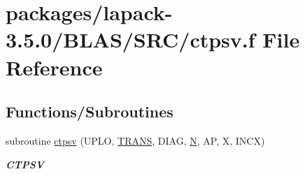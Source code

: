 \hypertarget{lapack-3_85_80_2BLAS_2SRC_2ctpsv_8f}{}\section{packages/lapack-\/3.5.0/\+B\+L\+A\+S/\+S\+R\+C/ctpsv.f File Reference}
\label{lapack-3_85_80_2BLAS_2SRC_2ctpsv_8f}
\subsection*{Functions/\+Subroutines}
\begin{DoxyCompactItemize}
\item 
subroutine \hyperlink{group__complex__blas__level2_ga1afdec04246cf2d0cb650ec237296ef3}{ctpsv} (U\+P\+L\+O, \hyperlink{superlu__enum__consts_8h_a0c4e17b2d5cea33f9991ccc6a6678d62a1f61e3015bfe0f0c2c3fda4c5a0cdf58}{T\+R\+A\+N\+S}, D\+I\+A\+G, \hyperlink{polmisc_8c_a0240ac851181b84ac374872dc5434ee4}{N}, A\+P, X, I\+N\+C\+X)
\begin{DoxyCompactList}\small\item\em {\bfseries C\+T\+P\+S\+V} \end{DoxyCompactList}\end{DoxyCompactItemize}
